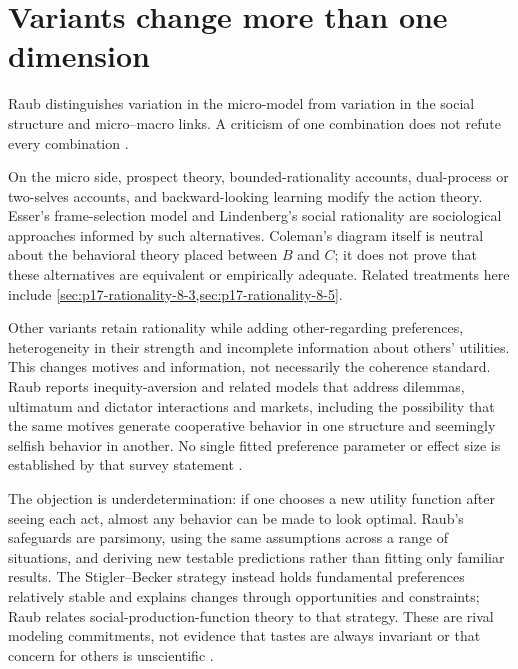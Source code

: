 \section{Variants change more than one dimension}
\label{sec:p17-rat104-variants}

Raub distinguishes variation in the micro-model from variation in the
social structure and micro--macro links. A criticism of one combination
does not refute every combination
\parencite[pp.~616--618]{Raub2021RationalChoiceSocialSciences}.

On the micro side, prospect theory, bounded-rationality accounts,
dual-process or two-selves accounts, and backward-looking learning modify
the action theory. Esser's frame-selection model and Lindenberg's social
rationality are sociological approaches informed by such alternatives.
Coleman's diagram itself is neutral about the behavioral theory placed
between \(B\) and \(C\); it does not prove that these alternatives are
equivalent or empirically adequate. Related treatments here include
\cref{sec:p17-rationality-8-3,sec:p17-rationality-8-5}.

Other variants retain rationality while adding other-regarding preferences,
heterogeneity in their strength and incomplete information about others'
utilities. This changes motives and information, not necessarily the
coherence standard. Raub reports inequity-aversion and related models that
address dilemmas, ultimatum and dictator interactions and markets, including
the possibility that the same motives generate cooperative behavior in one
structure and seemingly selfish behavior in another. No single fitted
preference parameter or effect size is established by that survey statement
\parencite[pp.~616--617]{Raub2021RationalChoiceSocialSciences}.

The objection is underdetermination: if one chooses a new utility function
after seeing each act, almost any behavior can be made to look optimal.
Raub's safeguards are parsimony, using the same assumptions across a range
of situations, and deriving new testable predictions rather than fitting
only familiar results. The Stigler--Becker strategy instead holds fundamental
preferences relatively stable and explains changes through opportunities
and constraints; Raub relates social-production-function theory to that
strategy. These are rival modeling commitments, not evidence that tastes
are always invariant or that concern for others is unscientific
\parencite[pp.~616--617]{Raub2021RationalChoiceSocialSciences}.


